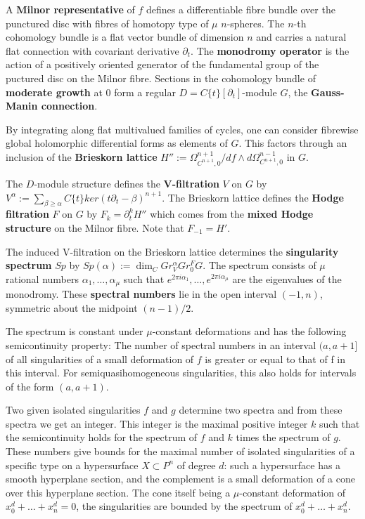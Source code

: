 A {\bf Milnor representative} of $f$ defines a differentiable fibre bundle over the punctured disc with fibres of homotopy type of $\mu$ $n$-spheres.
The $n$-th cohomology bundle is a flat vector bundle of dimension $n$ and carries a natural flat connection with covariant derivative $\partial_t$.
The {\bf monodromy operator} is the action of a positively oriented generator of the fundamental group of the puctured disc on the Milnor fibre.
Sections in the cohomology bundle of {\bf moderate growth} at $0$ form a regular $D=C\{t\}[\partial_t]$-module $G$, the {\bf Gauss-Manin connection}.

By integrating along flat multivalued families of cycles, one can consider fibrewise global holomorphic differential forms as elements of $G$.
This factors through an inclusion of the {\bf Brieskorn lattice} $H'':=\Omega^{n+1}_{C^{n+1},0}/df\wedge d\Omega^{n-1}_{C^{n+1},0}$ in $G$.

The $D$-module structure defines the {\bf V-filtration} $V$ on $G$ by $V^\alpha:=\sum_{\beta\ge\alpha}C\{t\}ker(t\partial_t-\beta)^{n+1}$.
The Brieskorn lattice defines the {\bf Hodge filtration} $F$ on $G$ by $F_k=\partial_t^kH''$ which comes from the {\bf mixed Hodge structure} on the Milnor fibre.
Note that $F_{-1}=H'$.

The induced V-filtration on the Brieskorn lattice determines the {\bf singularity spectrum} $Sp$ by $Sp(\alpha):=\dim_CGr_V^\alpha Gr^F_0G$.
The spectrum consists of $\mu$ rational numbers $\alpha_1,\dots,\alpha_\mu$ such that $e^{2\pi i\alpha_1},\dots,e^{2\pi i\alpha_\mu}$ are the eigenvalues of the monodromy.
These {\bf spectral numbers} lie in the open interval $(-1,n)$, symmetric about the midpoint $(n-1)/2$.

The spectrum is constant under $\mu$-constant deformations and has the following semicontinuity property:
The number of spectral numbers in an interval $(a,a+1]$ of all singularities of a small deformation of $f$ is greater or equal to that of f in this interval.
For semiquasihomogeneous singularities, this also holds for intervals of the form $(a,a+1)$.

Two given isolated singularities $f$ and $g$ determine two spectra and from these spectra we get an integer.
This integer is the maximal positive integer $k$ such that the semicontinuity holds for the spectrum of $f$ and $k$ times the spectrum of $g$.
These numbers give bounds for the maximal number of isolated singularities of a specific type on a hypersurface $X\subset{P}^n$ of degree $d$: 
such a hypersurface has a smooth hyperplane section, and the complement is a small deformation of a cone over this hyperplane section.
The cone itself being a $\mu$-constant deformation of $x_0^d+\dots+x_n^d=0$, the singularities are bounded by the spectrum of $x_0^d+\dots+x_n^d$.

